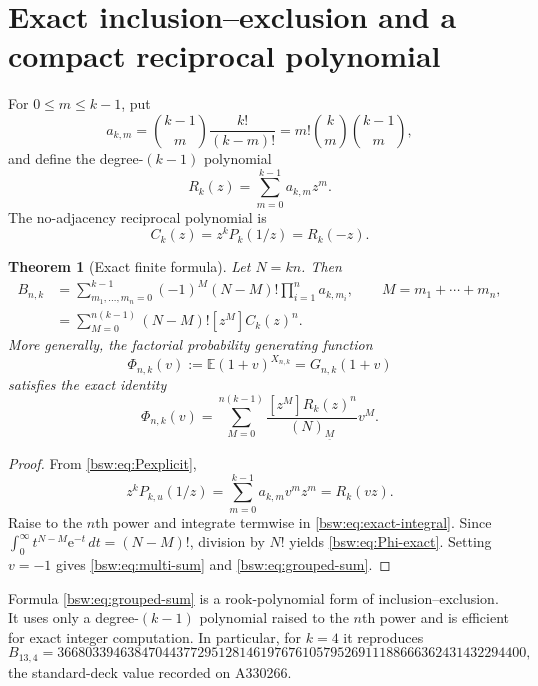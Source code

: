 \documentclass[11pt,letterpaper]{article}
\newtheorem{theorem}{Theorem}[section]
\theoremstyle{definition}
\theoremstyle{remark}
\newcommand{\EE}{\mathbb E}
\newcommand{\ee}{\mathrm e}
\newcommand{\fall}[2]{(#1)_{\underline{#2}}}
\newcommand{\coef}[2]{[#1]#2}
\begin{document}
\section{Exact inclusion--exclusion and a compact reciprocal polynomial}

For $0\le m\le k-1$, put
\begin{equation}\label{bsw:eq:akm}
 a_{k,m}=\binom{k-1}{m}\frac{k!}{(k-m)!}
        =m!\binom{k}{m}\binom{k-1}{m},
\end{equation}
and define the degree-$(k-1)$ polynomial
\begin{equation}\label{bsw:eq:Rk}
 R_k(z)=\sum_{m=0}^{k-1}a_{k,m}z^m.
\end{equation}
The no-adjacency reciprocal polynomial is
\begin{equation}\label{bsw:eq:Ck}
 C_k(z)=z^kP_k(1/z)=R_k(-z).
\end{equation}

\begin{theorem}[Exact finite formula]\label{bsw:thm:exact-sum}
Let $N=kn$.  Then
\begin{align}
 B_{n,k}
 &=\sum_{m_1,\ldots,m_n=0}^{k-1}
 (-1)^M(N-M)!\prod_{i=1}^n a_{k,m_i},
 \qquad M=m_1+\cdots+m_n,\label{bsw:eq:multi-sum}\\
 &=\sum_{M=0}^{n(k-1)}(N-M)!\coef{z^M}C_k(z)^n.
 \label{bsw:eq:grouped-sum}
\end{align}
More generally, the factorial probability generating function
\begin{equation}\label{bsw:eq:Phi-def}
 \Phi_{n,k}(v):=\EE(1+v)^{X_{n,k}}=G_{n,k}(1+v)
\end{equation}
satisfies the exact identity
\begin{equation}\label{bsw:eq:Phi-exact}
 \boxed{\displaystyle
 \Phi_{n,k}(v)=
 \sum_{M=0}^{n(k-1)}
 \frac{\coef{z^M}R_k(z)^n}{\fall{N}{M}}v^M.}
\end{equation}
\end{theorem}

\begin{proof}
From \eqref{bsw:eq:Pexplicit},
\[
 z^kP_{k,u}(1/z)=\sum_{m=0}^{k-1}a_{k,m}v^mz^m=R_k(vz).
\]
Raise to the $n$th power and integrate termwise in
\eqref{bsw:eq:exact-integral}.  Since
$\int_0^\infty t^{N-M}\ee^{-t}\,dt=(N-M)!$, division by $N!$ yields
\eqref{bsw:eq:Phi-exact}.  Setting $v=-1$ gives
\eqref{bsw:eq:multi-sum} and \eqref{bsw:eq:grouped-sum}.
\end{proof}

Formula \eqref{bsw:eq:grouped-sum} is a rook-polynomial form of
inclusion--exclusion.  It uses only a degree-$(k-1)$ polynomial raised to the
$n$th power and is efficient for exact integer computation.  In particular,
for $k=4$ it reproduces
\[
 B_{13,4}=
3668033946384704437729512814619767610579526911188666362431432294400,
\]
the standard-deck value recorded on A330266.
\end{document}
